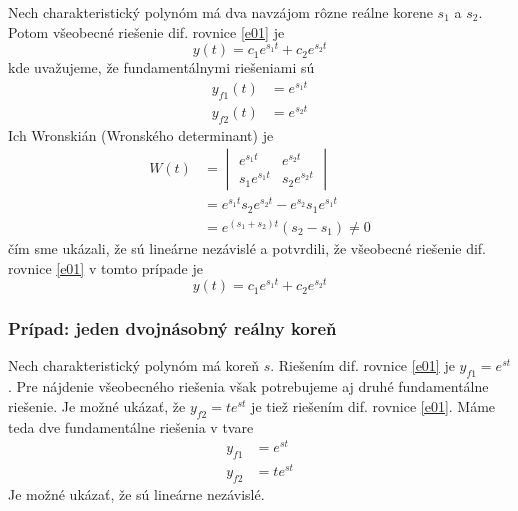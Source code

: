 \documentclass[a4paper, 10pt, ]{article}
\begin{document}
Nech charakteristický polynóm má dva navzájom rôzne reálne korene $s_1$ a $s_2$. Potom všeobecné riešenie dif. rovnice \eqref{e01} je
\begin{equation}
    y(t) = c_1 e^{s_1 t} + c_2 e^{s_2 t}
\end{equation}
kde uvažujeme, že fundamentálnymi riešeniami sú
\begin{subequations} \label{kfunr}
    \begin{align}
        y_{f1}(t) &= e^{s_1 t} \\
        y_{f2}(t) &= e^{s_2 t}
    \end{align} 
\end{subequations}
Ich Wronskián (Wronského determinant) \cite{Mihalikova2012, Kuben1995} je
\begin{equation}
    \begin{aligned}
        W(t) &= \begin{vmatrix}
            e^{s_1 t} & e^{s_2 t} \\
            s_1 e^{s_1 t} & s_2 e^{s_2 t}
        \end{vmatrix} \\
        &=e^{s_1t} s_2 e^{s_2t} - e^{s_2} s_1 e^{s_1t} \\
        &= e^{(s_1 + s_2) t} (s_2 - s_1) \neq 0
    \end{aligned}
\end{equation}
čím sme ukázali, že sú lineárne nezávislé a potvrdili, že všeobecné riešenie dif. rovnice \eqref{e01} v tomto prípade je
\begin{equation}
    y(t) = c_1 e^{s_1 t} + c_2 e^{s_2 t}
\end{equation}




\subsubsection{Prípad: jeden dvojnásobný reálny koreň}

Nech charakteristický polynóm má koreň $s$. Riešením dif. rovnice \eqref{e01} je $y_{f1} = e^{st}$. Pre nájdenie všeobecného riešenia však potrebujeme aj druhé fundamentálne riešenie. Je možné ukázať, že $y_{f2} = t e^{st}$ je tiež riešením dif. rovnice \eqref{e01}.
Máme teda dve fundamentálne riešenia v tvare
\begin{subequations}
    \begin{align}
        y_{f1} &= e^{st} \\
        y_{f2} &= t e^{st}
    \end{align}
\end{subequations}
Je možné ukázať, že sú lineárne nezávislé.
\end{document}
